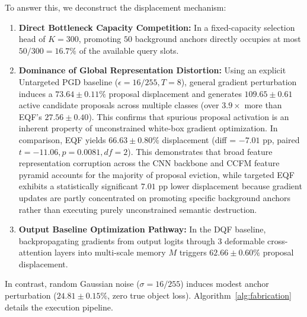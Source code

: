 \documentclass[preprint,12pt]{elsarticle}
\begin{document}
To answer this, we deconstruct the displacement mechanism:
\begin{enumerate}
    \item \textbf{Direct Bottleneck Capacity Competition:} In a fixed-capacity selection head of $K=300$, promoting $50$ background anchors directly occupies at most $50/300 = 16.7\%$ of the available query slots.
    \item \textbf{Dominance of Global Representation Distortion:} Using an explicit Untargeted PGD baseline ($\epsilon=16/255, T=8$), general gradient perturbation induces a $73.64 \pm 0.11\%$ proposal displacement and generates $109.65 \pm 0.61$ active candidate proposals across multiple classes (over $3.9\times$ more than EQF's $27.56 \pm 0.40$). This confirms that spurious proposal activation is an inherent property of unconstrained white-box gradient optimization. In comparison, EQF yields $66.63 \pm 0.80\%$ displacement (diff = $-7.01\text{ pp}$, paired $t=-11.06, p = 0.0081, df=2$). This demonstrates that broad feature representation corruption across the CNN backbone and CCFM feature pyramid accounts for the majority of proposal eviction, while targeted EQF exhibits a statistically significant $7.01\text{ pp}$ lower displacement because gradient updates are partly concentrated on promoting specific background anchors rather than executing purely unconstrained semantic destruction.
    \item \textbf{Output Baseline Optimization Pathway:} In the DQF baseline, backpropagating gradients from output logits through 3 deformable cross-attention layers into multi-scale memory $M$ triggers $62.66 \pm 0.60\%$ proposal displacement.
\end{enumerate}
In contrast, random Gaussian noise ($\sigma=16/255$) induces modest anchor perturbation ($24.81 \pm 0.15\%$, zero true object loss). Algorithm~\ref{alg:fabrication} details the execution pipeline.
\end{document}
